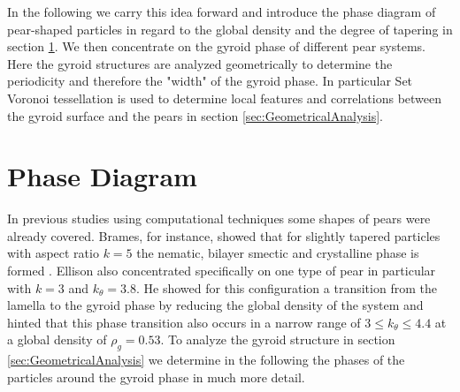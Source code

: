 \documentclass[epj,onecolumn]{webofc}
\begin{document}
In the following we carry this idea forward and introduce the phase diagram of pear-shaped particles in regard to the global density and the degree of tapering in section \ref{sec:PhaseDiagram}. We then concentrate on the 
gyroid phase of different pear systems. Here the gyroid structures are analyzed geometrically to determine the periodicity and therefore the "width" of the gyroid phase. In particular Set Voronoi tessellation is used to determine 
local features and correlations between the gyroid surface and the pears in section \ref{sec:GeometricalAnalysis}.

%



\section{Phase Diagram}
\label{sec:PhaseDiagram}

In previous studies using computational techniques some shapes of pears were already covered. Brames, for instance, showed that for slightly tapered particles with aspect ratio $k=5$ the nematic, bilayer smectic and crystalline 
phase is formed \cite{}. Ellison also concentrated specifically on one type of pear in particular with $k=3$ and $k_{\theta}=3.8$. He showed for this configuration a transition from the lamella to the gyroid phase by reducing the 
global density of the system and hinted that this phase transition also occurs in a narrow range of $3\leq k_{\theta}\leq 4.4$ at a global density of $\rho_g=0.53$. To analyze the gyroid structure in section 
\ref{sec:GeometricalAnalysis} we determine in the following the phases of the particles around the gyroid phase in much more detail.\\
\end{document}

